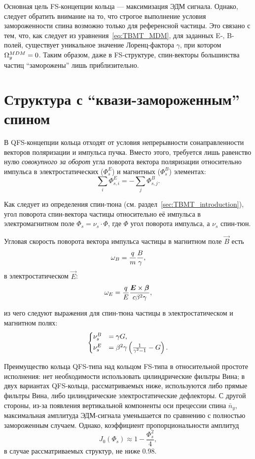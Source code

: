 Основная цель FS-концепции кольца --- максимизация ЭДМ сигнала. Однако, следует обратить внимание на то, что строгое выполнение условия замороженности спина возможно только для референсной частицы. Это связано с тем, что, как следует из уравнения~\eqref{eq:TBMT_MDM}, для заданных E-, B-полей, существует уникальное значение Лоренц-фактора $\gamma$, при котором $\Omega_y^{MDM} = 0$. Таким образом, даже в FS-структуре, спин-векторы большинства частиц ``заморожены'' лишь приблизительно.

\section{Структура с ``квази-замороженным'' спином} \label{sec:QFS_concept}
В QFS-концепции кольца отходят от условия непрерывности сонаправленности векторов поляризации и импульса пучка. Вместо этого, требуется лишь равенство нулю \emph{совокупного за оборот} угла поворота вектора поляризации относительно импульса в электростатических ($\Phi_s^E$) и магнитных ($\Phi_s^B$) элементах:~\cite{Senichev:Lattices}
\begin{equation*}
	\sum_i \Phi_{s,i}^E = -\sum_j \Phi_{s,j}^B.
\end{equation*}

Как следует из определения спин-тюна (см. раздел~\ref{sec:TBMT_introduction}), угол поворота спин-вектора частицы относительно её импульса в электромагнитном поле $\Phi_s = \nu_s \cdot \Phi$, где $\Phi$ угол поворота импульса, а $\nu_s$ спин-тюн.

Угловая скорость поворота вектора импульса частицы в магнитном поле $\vec B$ есть 
\[
\omega_B = \frac qm \frac B \gamma,
\]
в электростатическом $\vec E$:
\[
\omega_E = \frac qE \frac{\boldsymbol E\times \boldsymbol\beta}{c\beta^2\gamma},
\]

из чего следуют выражения для спин-тюна частицы в электростатическом и магнитном полях:
\begin{equation}
	\begin{cases}
		\nu_s^B &= \gamma G, \\
		\nu_s^E &= \beta^2\gamma\bkt{\frac{1}{\gamma^2-1} - G}.
	\end{cases}
\end{equation}

Преимущество кольца QFS-типа над кольцом FS-типа в относительной простоте исполнения: нет необходимости использовать цилиндрические фильтры Вина; в двух вариантах QFS-кольца, рассматриваемых ниже, используются либо прямые фильтры Вина, либо цилиндрические электростатические дефлекторы. С другой стороны, из-за появления вертикальной компоненты оси прецессии спина $\bar n_y$, максимальная амплитуда ЭДМ-сигнала уменьшается по сравнению с полностью замороженным случаем. Однако, коэффициент пропорциональности амплитуд
\[
J_0(\Phi_s) \approx 1 - \frac{\Phi_s^2}{4},
\]
в случае рассматриваемых структур, не ниже 0.98.~\cite[стр.~18]{Senichev:Lattices}

